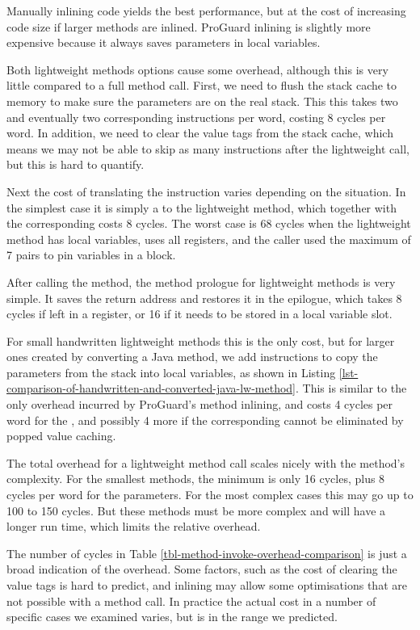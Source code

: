 Manually inlining code yields the best performance, but at the cost of increasing code size if larger methods are inlined. ProGuard inlining is slightly more expensive because it always saves parameters in local variables.

Both lightweight methods options cause some overhead, although this is very little compared to a full method call. First, we need to flush the stack cache to memory to make sure the parameters are on the real stack. This this takes two  and eventually two corresponding  instructions per word, costing 8 cycles per word. In addition, we need to clear the value tags from the stack cache, which means we may not be able to skip as many  instructions after the lightweight call, but this is hard to quantify.

Next the cost of translating the  instruction varies depending on the situation. In the simplest case it is simply a  to the lightweight method, which together with the corresponding  costs 8 cycles. The worst case is 68 cycles when the lightweight method has local variables, uses all registers, and the caller used the maximum of 7 pairs to pin variables in a  block.

After calling the method, the method prologue for lightweight methods is very simple. It saves the return address and restores it in the epilogue, which takes 8 cycles if left in a register, or 16 if it needs to be stored in a local variable slot.

For small handwritten lightweight methods this is the only cost, but for larger ones created by converting a Java method, we add  instructions to copy the parameters from the stack into local variables, as shown in Listing \ref{lst-comparison-of-handwritten-and-converted-java-lw-method}. This is similar to the only overhead incurred by ProGuard's method inlining, and costs 4 cycles per word for the , and possibly 4 more if the corresponding  cannot be eliminated by popped value caching.

The total overhead for a lightweight method call scales nicely with the method's complexity. For the smallest methods, the minimum is only 16 cycles, plus 8 cycles per word for the parameters. For the most complex cases this may go up to 100 to 150 cycles. But these methods must be more complex and will have a longer run time, which limits the relative overhead.

The number of cycles in Table \ref{tbl-method-invoke-overhead-comparison} is just a broad indication of the overhead. Some factors, such as the cost of clearing the value tags is hard to predict, and inlining may allow some optimisations that are not possible with a method call. In practice the actual cost in a number of specific cases we examined varies, but is in the range we predicted.

